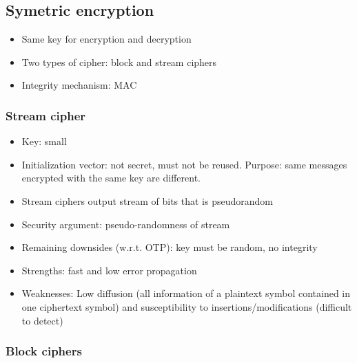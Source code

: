 \documentclass{article}
\newenvironment{myitemize}
{ \begin{itemize}
    \setlength{\itemsep}{005pt}
    \setlength{\parskip}{0pt}
    \setlength{\parsep}{0pt}     }
{ \end{itemize}                  }
\begin{document}
\begin{multicols}{2}
\subsection{Symetric encryption}

\begin{myitemize}
    \item Same key for encryption and decryption
    \item Two types of cipher: block and stream ciphers
    \item Integrity mechanism: MAC
\end{myitemize}

\subsubsection{Stream cipher}

\begin{myitemize}
    \item Key: small
    \item Initialization vector: not secret, must not be reused. Purpose: same messages encrypted with the same key are different. 
    \item Stream ciphers output stream of bits that is pseudorandom 
    \item Security argument: pseudo-randomness of stream
    \item Remaining downsides (w.r.t. OTP): key must be random, no integrity
    \item Strengths: fast and low error propagation
    \item Weaknesses: Low diffusion (all information of a plaintext symbol contained in one ciphertext symbol) and susceptibility to insertions/modifications (difficult to detect)
\end{myitemize}

\subsubsection{Block ciphers}


\end{multicols}
\end{document}
